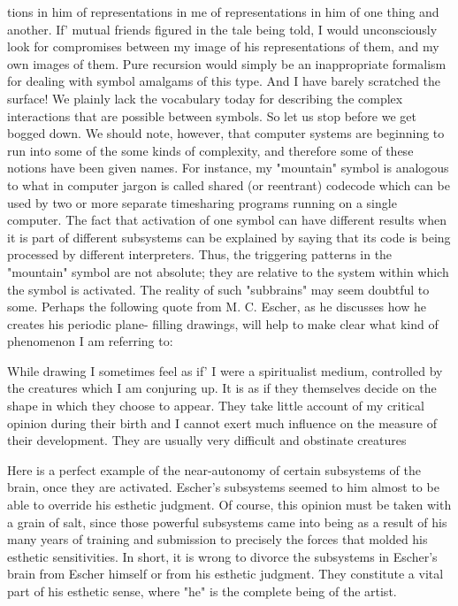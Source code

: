 tions in him of representations in me of representations in him of one thing and another.
If' mutual friends figured in the tale being told, I would unconsciously look for
compromises between my image of his representations of them, and my own images of
them. Pure recursion would simply be an inappropriate formalism for dealing with
symbol amalgams of this type. And I have barely scratched the surface!
We plainly lack the vocabulary today for describing the complex interactions that are
possible between symbols. So let us stop before we get bogged down.
        We should note, however, that computer systems are beginning to run into some
of the some kinds of complexity, and therefore some of these notions have been given
names. For instance, my "mountain" symbol is analogous to what in computer jargon is
called shared (or reentrant) codecode which can be used by two or more separate
timesharing programs running on a single computer. The fact that activation of one
symbol can have different results when it is part of different subsystems can be explained
by saying that its code is being processed by different interpreters. Thus, the triggering
patterns in the "mountain" symbol are not absolute; they are relative to the system within
which the symbol is activated.
        The reality of such "subbrains" may seem doubtful to some. Perhaps the
following quote from M. C. Escher, as he discusses how he creates his periodic plane-
filling drawings, will help to make clear what kind of phenomenon I am referring to:

      While drawing I sometimes feel as if' I were a spiritualist medium, controlled
      by the creatures which I am conjuring up. It is as if they themselves decide on
      the shape in which they choose to appear. They take little account of my
      critical opinion during their birth and I cannot exert much influence on the
      measure of their development. They are usually very difficult and obstinate
      creatures

        Here is a perfect example of the near-autonomy of certain subsystems of the
brain, once they are activated. Escher's subsystems seemed to him almost to be able to
override his esthetic judgment. Of course, this opinion must be taken with a grain of salt,
since those powerful subsystems came into being as a result of his many years of training
and submission to precisely the forces that molded his esthetic sensitivities. In short, it is
wrong to divorce the subsystems in Escher's brain from Escher himself or from his
esthetic judgment. They constitute a vital part of his esthetic sense, where "he" is the
complete being of the artist.

